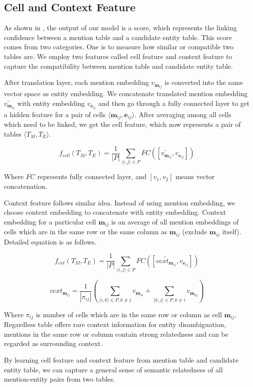 \subsection{Cell and Context Feature}
\label{sec:cell}

As shown in , the output of our model is a score, which represents the linking confidence between a mention table and a candidate entity table. This score comes from two categories. One is to measure how similar or compatible two tables are. We employ two features called cell feature and context feature to capture the compatibility between mention table and candidate entity table.

After translation layer, each mention embedding $v_{\textbf{m}_{ij}}$ is converted into the same vector space as entity embedding. We concatenate translated mention embedding $\widetilde{v_{\textbf{m}_{ij}}}$ with entity embedding $v_{\textbf{e}_{ij}}$ and then go through a fully connected layer to get a hidden feature for a pair of cells $\langle \textbf{m}_{ij}, \textbf{e}_{ij}\rangle$. After averaging among all cells which need to be linked, we get the cell feature, which now represents a pair of tables $\langle T_M, T_E \rangle$.

\begin{equation}
f_{cell}(T_M, T_E) = \frac{1}{|P|}\sum_{\langle i,j\rangle \in P}FC([\widetilde{v_{\textbf{m}_{ij}}}, v_{\textbf{e}_{ij}}])
\end{equation}

Where $FC$ represents fully connected layer, and $[v_1, v_2]$ means vector concatenation.

Context feature follows similar idea. Instead of using mention embedding, we choose context embedding to concatenate with entity embedding. Context embedding for a particular cell $\textbf{m}_{ij}$ is an average of all mention embeddings of cells which are in the same row or the same column as $\textbf{m}_{ij}$ (exclude $\textbf{m}_{ij}$ itself). Detailed equation is as follows.

\begin{equation}
	f_{cxt}(T_M, T_E) = \frac{1}{|P|}\sum_{\langle i,j\rangle \in P}FC([\widetilde{vcxt_{\textbf{m}_{ij}}}, v_{\textbf{e}_{ij}}])
\end{equation}

\begin{equation}
vcxt_{\textbf{m}_{ij}} = \frac{1}{|\pi_{ij}|}(\sum_{\langle i,k\rangle \in P, k \neq j} v_{\textbf{m}_{ik}} + \sum_{\langle k,j\rangle \in P, k \neq i} v_{\textbf{m}_{kj}})
\end{equation}

Where $\pi_{ij}$ is number of cells which are in the same row or column as cell $\textbf{m}_{ij}$. 
Regardless table offers rare context information for entity disambiguation, mentions in the same row or column contain strong relatedness and can be regarded as surrounding context. 

By learning cell feature and context feature from mention table and candidate entity table, we can capture a general sense of semantic relatedness of all mention-entity pairs from two tables.






